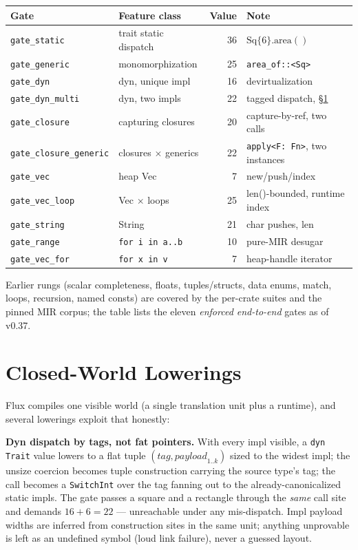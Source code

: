 \documentclass[11pt]{article}
\begin{document}
\begin{center}
\begin{tabular}{llrl}
\toprule
Gate & Feature class & Value & Note \\
\midrule
\texttt{gate\_static} & trait static dispatch & 36 & $\mathrm{Sq}\{6\}.\mathrm{area}()$ \\
\texttt{gate\_generic} & monomorphization & 25 & \texttt{area\_of::<Sq>} \\
\texttt{gate\_dyn} & dyn, unique impl & 16 & devirtualization \\
\texttt{gate\_dyn\_multi} & dyn, two impls & 22 & tagged dispatch, \S\ref{sec:lowerings} \\
\texttt{gate\_closure} & capturing closures & 20 & capture-by-ref, two calls \\
\texttt{gate\_closure\_generic} & closures $\times$ generics & 22 & \texttt{apply<F: Fn>}, two instances \\
\texttt{gate\_vec} & heap Vec & 7 & new/push/index \\
\texttt{gate\_vec\_loop} & Vec $\times$ loops & 25 & len()-bounded, runtime index \\
\texttt{gate\_string} & String & 21 & char pushes, len \\
\texttt{gate\_range} & \texttt{for i in a..b} & 10 & pure-MIR desugar \\
\texttt{gate\_vec\_for} & \texttt{for x in v} & 7 & heap-handle iterator \\
\bottomrule
\end{tabular}
\end{center}

Earlier rungs (scalar completeness, floats, tuples/structs, data enums, match,
loops, recursion, named consts) are covered by the per-crate suites and the
pinned MIR corpus; the table lists the eleven \emph{enforced end-to-end} gates
as of v0.37.

\section{Closed-World Lowerings}\label{sec:lowerings}
Flux compiles one visible world (a single translation unit plus a runtime), and
several lowerings exploit that honestly:

\textbf{Dyn dispatch by tags, not fat pointers.} With every impl visible, a
\texttt{dyn Trait} value lowers to a flat tuple $(\mathit{tag},
\mathit{payload}_{1..k})$ sized to the widest impl; the unsize coercion becomes
tuple construction carrying the source type's tag; the call becomes a
\texttt{SwitchInt} over the tag fanning out to the already-canonicalized static
impls. The gate passes a square and a rectangle through the \emph{same} call
site and demands $16+6=22$ --- unreachable under any mis-dispatch. Impl payload
widths are inferred from construction sites in the same unit; anything
unprovable is left as an undefined symbol (loud link failure), never a guessed
layout.
\end{document}

